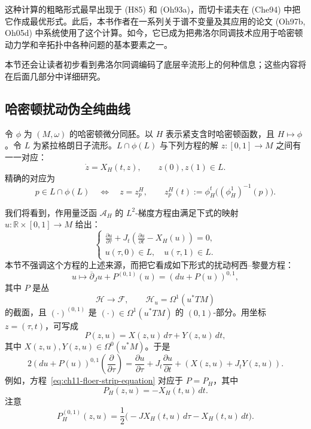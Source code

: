这种计算的粗略形式最早出现于 (H85) 和 (Oh93a)，而切卡诺夫在 (Che94) 中把它作成最优形式。此后，本书作者在一系列关于谱不变量及其应用的论文 (Oh97b, Oh05d) 中系统使用了这个计算。如今，它已成为把弗洛尔同调技术应用于哈密顿动力学和辛拓扑中各种问题的基本要素之一。

本节还会让读者初步看到弗洛尔同调编码了底层辛流形上的何种信息；这些内容将在后面几部分中详细研究。

\subsection{哈密顿扰动伪全纯曲线}
\label{subsec:hamiltonian-perturbed-pseudoholomorphic-curves}

令 $\phi$ 为 $(M,\omega)$ 的哈密顿微分同胚。以 $H$ 表示紧支含时哈密顿函数，且 $H\mapsto\phi$。令 $L$ 为紧拉格朗日子流形。$L\cap\phi(L)$ 与下列方程的解
$z:[0,1]\to M$ 之间有一一对应：
\begin{equation}
 \dot z=X_H(t,z),\qquad z(0),z(1)\in L.
 \label{eq:ch11-hamiltonian-chord}
\end{equation}
精确的对应为
\begin{equation}
 p\in L\cap\phi(L)
 \quad\Longleftrightarrow\quad
 z=z_p^H,
 \qquad z_p^H(t):=\phi_H^t\bigl((\phi_H^1)^{-1}(p)\bigr).
 \label{eq:ch11-intersection-hamiltonian-chord-correspondence}
\end{equation}

我们将看到，作用量泛函 $\mathcal A_H$ 的 $L^2$-梯度方程由满足下式的映射
$u:\mathbb R\times[0,1]\to M$ 给出：
\begin{equation}
 \begin{cases}
  \displaystyle\frac{\partial u}{\partial\tau}
  +J_t\left(\frac{\partial u}{\partial t}-X_H(u)\right)=0,\\[5pt]
  u(\tau,0)\in L,\quad u(\tau,1)\in L.
 \end{cases}
 \label{eq:ch11-floer-strip-equation}
\end{equation}
本节不强调这个方程的上述来源，而把它看成如下形式的扰动柯西--黎曼方程：
\[
 u\longmapsto\overline\partial_Ju+P^{(0,1)}(u)
 =(du+P(u))^{0,1},
\]
其中 $P$ 是丛
\[
 \mathcal H\longrightarrow\mathcal F,
 \qquad \mathcal H_u=\Omega^1(u^*TM)
\]
的截面，且 $(\mathord\cdot)^{(0,1)}$ 是
$(\mathord\cdot)\in\Omega^1(u^*TM)$ 的 $(0,1)$-部分。用坐标
$z=(\tau,t)$，可写成
\[
 P(z,u)=X(z,u)\,d\tau+Y(z,u)\,dt,
\]
其中 $X(z,u),Y(z,u)\in\Omega^0(u^*M)$。于是
\[
 2(du+P(u))^{0,1}\left(\frac{\partial}{\partial\tau}\right)
 =\frac{\partial u}{\partial\tau}
 +J_t\frac{\partial u}{\partial t}
 +(X(z,u)+J_tY(z,u)).
\]
例如，方程~\eqref{eq:ch11-floer-strip-equation} 对应于 $P=P_H$，其中
\[
 P_H(z,u)=-X_H(t,u)\,dt.
\]
注意
\[
 P_H^{(0,1)}(z,u)
 =\frac12\bigl(-JX_H(t,u)\,d\tau-X_H(t,u)\,dt\bigr).
\]

